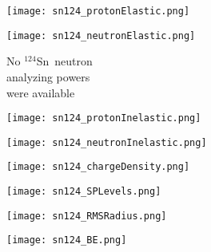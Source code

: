 \documentclass[twocolumn,secnumarabic,amssymb, nobibnotes, aps, prl,
superscriptaddress, nobalancelastpage, floatfix]{revtex4}
\newcommand{\snFour}{\ensuremath{^{124}}S\lowercase{n}}
\begin{document}
{\begin{figure*}[!htb]
    \centering
    \begin{minipage}{0.4\linewidth}
        \centering
        \texttt{[image: sn124\_protonElastic.png]}
        \label{DOM_sn124_proton_elastic}
    \end{minipage}\hspace{6pt}
    \begin{minipage}{0.4\linewidth}
        \vspace{-10pt}
        \begin{minipage}{0.5\linewidth}
            \texttt{[image: sn124\_neutronElastic.png]}
        \end{minipage}
        \begin{minipage}{0.45\linewidth}
            \centering
            No \snFour\ neutron \\
            analyzing powers \\
            were available
        \end{minipage}
        \label{DOM_sn124_neutron_elastic}
    \end{minipage}
    \begin{minipage}{0.4\linewidth}
        \centering
        \texttt{[image: sn124\_protonInelastic.png]}
        \label{DOM_sn124_proton_inelastic}
    \end{minipage}\hspace{6pt}
    \begin{minipage}{0.4\linewidth}
        \centering
        \texttt{[image: sn124\_neutronInelastic.png]}
        \label{DOM_sn124_neutron_inelastic}
    \end{minipage}
    \centering
    \begin{minipage}{0.4\linewidth}
        \centering
        \texttt{[image: sn124\_chargeDensity.png]}
        \label{DOM_sn124_chargeDensity}
    \end{minipage}\hspace{6pt}
    \begin{minipage}{0.4\linewidth}
        \centering
        \texttt{[image: sn124\_SPLevels.png]}
        \label{DOM_sn124_SPLevels}
    \end{minipage}
    \begin{minipage}{0.4\linewidth}
        \centering
        \texttt{[image: sn124\_RMSRadius.png]}
        \label{DOM_sn124_RMSRadius}
    \end{minipage}\hspace{6pt}
    \begin{minipage}{0.4\linewidth}
        \centering
        \texttt{[image: sn124\_BE.png]}
        \label{DOM_sn124_BE}
    \end{minipage}
    \caption{\snFour: constraining experimental data and DOM fit. See introduction of
    Appendix C for description.}
    \label{DOM_sn124}
\end{figure*}

}
\end{document}
